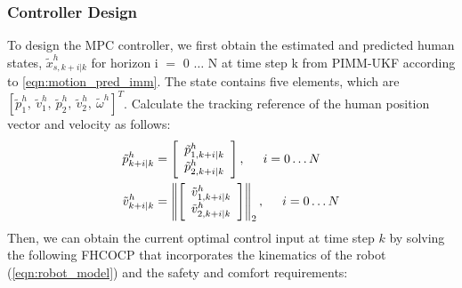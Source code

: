 \documentclass[journal]{IEEEtran}
\begin{document}
\subsubsection{Controller Design}
To design the MPC controller, we first obtain the estimated and predicted human states, $\tilde{x}^{h}_{s,k+i|k}$ for horizon i $=$ 0 $\dots$ N at time step k from PIMM-UKF according to \cref{eqn:motion_pred_imm}. The state contains five elements, which are
$\left[\tilde{p}^{h}_{1},~\tilde{v}^{h}_{1},~\tilde{p}^{h}_{2},~\tilde{v}^{h}_{2},~\tilde{\omega}^{h}\right]^T$. %
Calculate the tracking reference of the human position vector and velocity as follows: 
\begin{align}
\tilde{p}^h_{k+i|k}&=
	\left[ \begin{array}{c}
	\tilde{p}^h_{1,k+i|k} \nonumber\\	  
  \tilde{p}^h_{2,k+i|k}\end{array}\right], \hspace{5mm} i = 0 \dots N\\   \tilde{v}^h_{k+i|k}&=
	\left\|\left[ \begin{array}{c}
	\tilde{v}^h_{1,k+i|k} \nonumber\\	\tilde{v}^h_{2,k+i|k}\end{array}\right]\right\|_2, \hspace{5mm} i = 0 \dots N
\end{align}
Then, we can obtain the current optimal control input at time step $k$ by solving the following FHCOCP that incorporates the kinematics of the robot (\ref{eqn:robot_model}) and the safety and comfort requirements:
\end{document}
